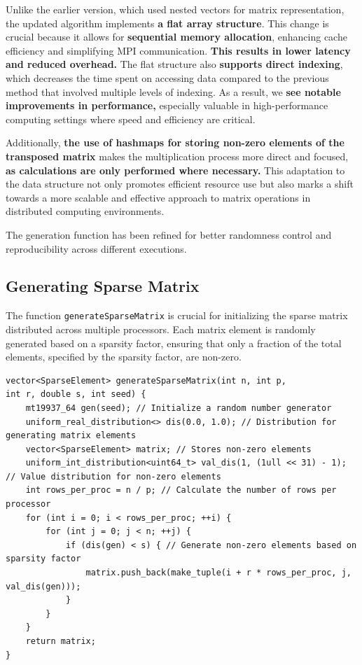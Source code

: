 \documentclass{article}
\begin{document}
Unlike the earlier version, which used nested vectors for matrix representation, the updated algorithm implements \textbf{a flat array structure}. This change is crucial because it allows for \textbf{sequential memory allocation}, enhancing cache efficiency and simplifying MPI communication. \textbf{This results in lower latency and reduced overhead. }The flat structure also \textbf{supports direct indexing}, which decreases the time spent on accessing data compared to the previous method that involved multiple levels of indexing. As a result, we \textbf{see notable improvements in performance,} especially valuable in high-performance computing settings where speed and efficiency are critical.

Additionally, \textbf{the use of hashmaps for storing non-zero elements of the transposed matrix }makes the multiplication process more direct and focused, \textbf{as calculations are only performed where necessary.} This adaptation to the data structure not only promotes efficient resource use but also marks a shift towards a more scalable and effective approach to matrix operations in distributed computing environments.

The generation function has been refined for better randomness control and reproducibility across different executions.

\subsection{Generating Sparse Matrix}
The function \texttt{generateSparseMatrix} is crucial for initializing the sparse matrix distributed across multiple processors. Each matrix element is randomly generated based on a sparsity factor, ensuring that only a fraction of the total elements, specified by the sparsity factor, are non-zero.

\begin{verbatim}
vector<SparseElement> generateSparseMatrix(int n, int p,
int r, double s, int seed) {
    mt19937_64 gen(seed); // Initialize a random number generator
    uniform_real_distribution<> dis(0.0, 1.0); // Distribution for generating matrix elements
    vector<SparseElement> matrix; // Stores non-zero elements
    uniform_int_distribution<uint64_t> val_dis(1, (1ull << 31) - 1); // Value distribution for non-zero elements
    int rows_per_proc = n / p; // Calculate the number of rows per processor
    for (int i = 0; i < rows_per_proc; ++i) {
        for (int j = 0; j < n; ++j) {
            if (dis(gen) < s) { // Generate non-zero elements based on sparsity factor
                matrix.push_back(make_tuple(i + r * rows_per_proc, j, val_dis(gen)));
            }
        }
    }
    return matrix;
}
\end{verbatim}
\end{document}

